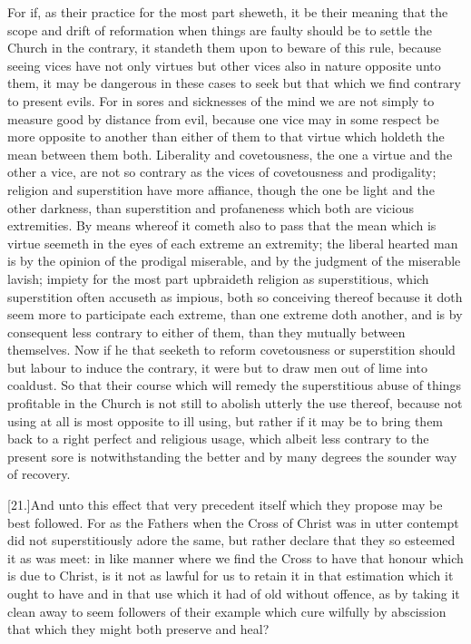 For if, as their practice for the most part sheweth, it be their meaning that the scope and drift of reformation when things are faulty should be to settle the Church in the contrary, it standeth them upon to beware of this rule, because seeing vices have not only virtues but other vices also in nature opposite unto them, it may be dangerous in these cases to seek but that which we find contrary to present evils. For in sores and sicknesses of the mind we are not simply to measure good by distance from evil, because one vice may in some respect be more opposite to another than either of them to that virtue which holdeth the mean between them both. Liberality and covetousness, the one a virtue and the other a vice, are not so contrary as the vices of covetousness and prodigality; religion and superstition have more affiance, though the one be light and the other darkness, than superstition and profaneness which both are vicious extremities. By means whereof it cometh also to pass that the mean which is virtue seemeth in the eyes of each extreme an extremity; the liberal hearted man is by the opinion of the prodigal miserable, and by the judgment of the miserable lavish; impiety for the most part upbraideth religion as superstitious, which superstition often accuseth as impious, both so conceiving thereof because it doth seem more to participate each extreme, than one extreme doth another, and is by consequent less contrary to either of them, than they mutually between themselves. Now if he that seeketh to reform covetousness or superstition should but labour to induce the contrary, it were but to draw men out of lime into coaldust. So that their course which will remedy the superstitious abuse of things profitable in the Church is not still to abolish utterly the use thereof, because not using at all is most opposite to ill using, but rather if it may be to bring them back to a right perfect and religious usage, which albeit less contrary to the present sore is notwithstanding the better and by many degrees the sounder way of recovery.

[21.]And unto this effect that very precedent itself which they propose may be best followed. For as the Fathers when the Cross of Christ was in utter contempt did not superstitiously adore the same, but rather declare that they so esteemed it as was meet: in like manner where we find the Cross to have that honour which is due to Christ, is it not as lawful for us to  retain it in that estimation which it ought to have and in that use which it had of old without offence,
 as by taking it clean away to seem followers of their example which cure wilfully by abscission that which they might both preserve and heal?

